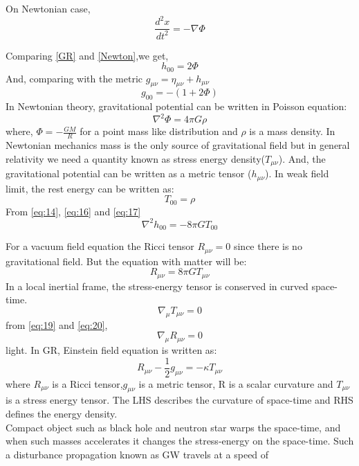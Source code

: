 \documentclass{ttuthes2007}
\begin{document}
On Newtonian case,
\begin{equation} \label{Newton}
\frac{d^2x}{dt^2}=-\nabla \Phi
\end{equation}

Comparing \ref{GR} and \ref{Newton},we get,
\begin{equation} \label{eq:14}
h_{00}=2\Phi
\end{equation}
And, comparing with the metric $g_{\mu \nu}= \eta_{\mu \nu} + h_{\mu \nu}$
\begin{equation}\label{eq:15}
g_{00}=-(1+2\Phi)
\end{equation}
In Newtonian theory, gravitational potential can be written in Poisson
equation:
\begin{equation} \label{eq:16}
\nabla ^ 2\Phi = 4\pi G\rho
\end{equation}
where, $\Phi=-\frac{GM}{R}$ for a point mass like distribution and $\rho$ is a
mass density. In Newtonian mechanics mass is the only source of gravitational
field but in general relativity we need a quantity known as stress energy
density($T_{\mu\nu}$). And, the gravitational potential can be written as a metric
tensor ($h_{\mu\nu}$).
In weak field limit, the rest energy can be written as:
\begin{equation}\label{eq:17}
T_{00}=\rho
\end{equation}
From \ref{eq:14}, \ref{eq:16} and \ref{eq:17}
\begin{equation} \label{eq:18}
\nabla ^2h_{00}=-8\pi GT_{00}
\end{equation}
	
	For a vacuum field equation the Ricci tensor $R_{\mu \nu} = 0$ since
there is no gravitational field. But the equation with matter will be:
\begin{equation} \label{eq:19}
R_{\mu \nu} = 8 \pi GT_{\mu \nu}
\end{equation}
In a local inertial frame, the stress-energy tensor is conserved in curved
space-time.
\begin{equation} \label{eq:20}
\nabla _\mu T_{\mu \nu} =0
\end{equation}
from \ref{eq:19} and \ref{eq:20},
\begin{equation}
\nabla _\mu R_{\mu \nu} =0
\end{equation}
light. In GR, Einstein field equation is written as:
\begin{equation}
R_{\mu\nu} -\frac{1}{2}g_{\mu\nu}=-\kappa T_{\mu\nu}
\end{equation}	
where $R_{\mu\nu}$ is a Ricci tensor,$g_{\mu\nu}$ is a metric tensor, R is a scalar
curvature and $T_{\mu\nu}$ is a stress energy tensor. The LHS describes the
curvature of space-time and RHS defines the energy density.\\
Compact object such as black hole and neutron star warps the
space-time, and when such masses accelerates it changes the stress-energy on the
space-time. Such a disturbance propagation known as GW travels at a speed of
\end{document}
